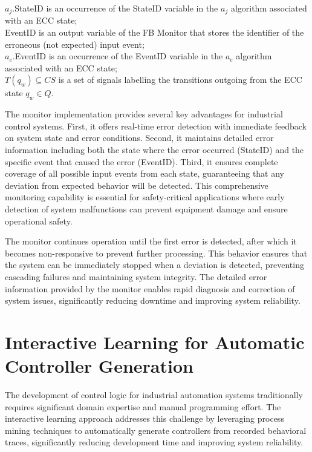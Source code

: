 \begin{algorithm}[T]
$a_j$.StateID is an occurrence of the  StateID  variable in the $a_j$ algorithm  associated with an ECC state;   \\

EventID is an  output variable of the FB Monitor that stores the identifier of the erroneous (not expected) input event; \\

$a_e$.EventID is an  occurrence of the EventID variable in the $a_e$ algorithm associated with an ECC state; \\

$T(q_w) \subseteq CS$ is a set of signals labelling the transitions outgoing from the ECC state $q_w \in Q$.

\end{algorithm}

The monitor implementation provides several key advantages for industrial control systems. First, it offers real-time error detection with immediate feedback on system state and error conditions. Second, it maintains detailed error information including both the state where the error occurred (StateID) and the specific event that caused the error (EventID). Third, it ensures complete coverage of all possible input events from each state, guaranteeing that any deviation from expected behavior will be detected. This comprehensive monitoring capability is essential for safety-critical applications where early detection of system malfunctions can prevent equipment damage and ensure operational safety.

The monitor continues operation until the first error is detected, after which it becomes non-responsive to prevent further processing. This behavior ensures that the system can be immediately stopped when a deviation is detected, preventing cascading failures and maintaining system integrity. The detailed error information provided by the monitor enables rapid diagnosis and correction of system issues, significantly reducing downtime and improving system reliability.

\section{Interactive Learning for Automatic Controller Generation}

The development of control logic for industrial automation systems traditionally requires significant domain expertise and manual programming effort. The interactive learning approach addresses this challenge by leveraging process mining techniques to automatically generate controllers from recorded behavioral traces, significantly reducing development time and improving system reliability.

